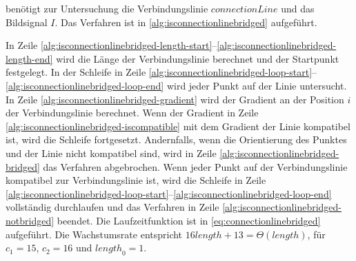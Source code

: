  benötigt zur Untersuchung die Verbindungslinie $\mathit{connectionLine}$ und das
 Bildsignal $I$. Das Verfahren ist in \autoref{alg:isconnectionlinebridged} aufgeführt.

In Zeile \ref{alg:isconnectionlinebridged-length-start}--\ref{alg:isconnectionlinebridged-length-end} wird die Länge
 der Verbindungslinie berechnet und der Startpunkt festgelegt. In der Schleife in Zeile
 \ref{alg:isconnectionlinebridged-loop-start}--\ref{alg:isconnectionlinebridged-loop-end} wird jeder Punkt auf der
 Linie untersucht. In Zeile \ref{alg:isconnectionlinebridged-gradient} wird der Gradient an der Position $i$  der
 Verbindungslinie berechnet. Wenn der Gradient in Zeile \ref{alg:isconnectionlinebridged-iscompatible} mit dem Gradient
 der Linie kompatibel ist, wird die Schleife fortgesetzt. Andernfalls, wenn die Orientierung des Punktes und der Linie
 nicht kompatibel sind, wird in Zeile \ref{alg:isconnectionlinebridged-bridged} das Verfahren abgebrochen. Wenn jeder
 Punkt auf der Verbindungslinie kompatibel zur Verbindungslinie ist, wird die Schleife in Zeile
 \ref{alg:isconnectionlinebridged-loop-start}--\ref{alg:isconnectionlinebridged-loop-end} vollständig durchlaufen und
 das Verfahren in Zeile \ref{alg:isconnectionlinebridged-notbridged} beendet. Die Laufzeitfunktion ist in
 \autoref{eq:connectionlinebridged} aufgeführt. Die Wachstumsrate entspricht
 $16\mathit{length} + 13 = \Theta(\mathit{length})$, für $c_{1} = 15$, $c_{2} = 16$ und $\mathit{length}_{0} = 1$.


